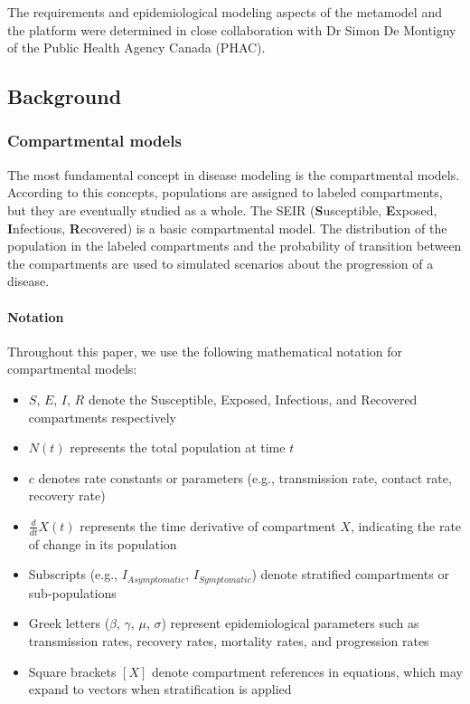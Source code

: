 The requirements and epidemiological modeling aspects of the metamodel and the platform were determined in close collaboration with Dr Simon De Montigny of the Public Health Agency Canada (PHAC). 

\subsection{Background}

\subsubsection{Compartmental models}

The most fundamental concept in disease modeling is the compartmental models. According to this concepts, populations are assigned to labeled compartments, but they are eventually studied as a whole. The SEIR (\textbf{S}usceptible, \textbf{E}xposed, \textbf{I}nfectious, \textbf{R}ecovered) is a basic compartmental model. The distribution of the population in the labeled compartments and the probability of transition between the compartments are used to simulated scenarios about the progression of a disease.

\paragraph{Notation}

Throughout this paper, we use the following mathematical notation for compartmental models:
\begin{itemize}
    \item $S$, $E$, $I$, $R$ denote the Susceptible, Exposed, Infectious, and Recovered compartments respectively
    \item $N(t)$ represents the total population at time $t$
    \item $c$ denotes rate constants or parameters (e.g., transmission rate, contact rate, recovery rate)
    \item $\frac{d}{dt}X(t)$ represents the time derivative of compartment $X$, indicating the rate of change in its population
    \item Subscripts (e.g., $I_{Asymptomatic}$, $I_{Symptomatic}$) denote stratified compartments or sub-populations
    \item Greek letters ($\beta$, $\gamma$, $\mu$, $\sigma$) represent epidemiological parameters such as transmission rates, recovery rates, mortality rates, and progression rates
    \item Square brackets $[X]$ denote compartment references in equations, which may expand to vectors when stratification is applied
\end{itemize} 

